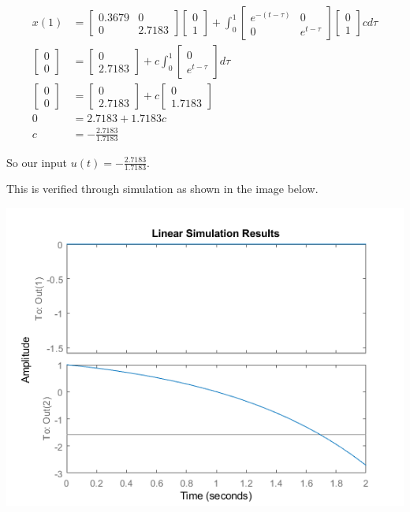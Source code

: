 \documentclass[]{article}
\begin{document}
\begin{align*}
	x(1) &= \begin{bmatrix}
	0.3679 & 0 \\
	0 & 2.7183
	\end{bmatrix} \begin{bmatrix}
	0 \\
	1
	\end{bmatrix} + \int_{0}^{1}\begin{bmatrix}
	e^{-(t-\tau)} & 0 \\
	0 & e^{t-\tau}
	\end{bmatrix}\begin{bmatrix}
	0 \\
	1
	\end{bmatrix}cd\tau \\
	\begin{bmatrix}
	0 \\
	0
	\end{bmatrix} &= \begin{bmatrix}
	0 \\
	2.7183
	\end{bmatrix} + c\int_{0}^{1} \begin{bmatrix}
	0 \\
	e^{t-\tau}
	\end{bmatrix}
	d\tau \\
	\begin{bmatrix}
	0 \\
	0
	\end{bmatrix} &= \begin{bmatrix}
	0 \\
	2.7183
	\end{bmatrix} + c\begin{bmatrix}
	0 \\
	1.7183
	\end{bmatrix} \\
	0 &= 2.7183 + 1.7183c \\
	c &= -\frac{2.7183}{1.7183}
\end{align*}

So our input $u(t) = -\frac{2.7183}{1.7183}$.

This is verified through simulation as shown in the image below.

\includegraphics[width=\textwidth]{q6.png}
\end{document}
